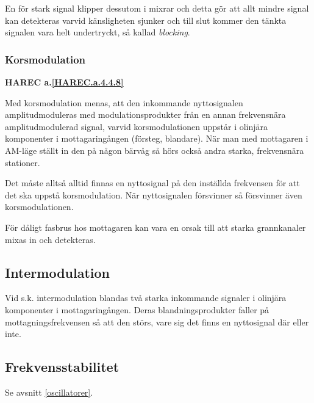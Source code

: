En för stark signal klipper dessutom i mixrar och detta gör att allt mindre
signal kan detekteras varvid känsligheten sjunker och till slut kommer den
tänkta signalen vara helt undertryckt, så kallad \emph{blocking}.

\subsubsection{Korsmodulation}
\textbf{HAREC
  a.\ref{HAREC.a.4.4.8}\label{myHAREC.a.4.4.8}
}

Med korsmodulation menas, att den inkommande nyttosignalen amplitudmoduleras
med modulationsprodukter från en annan frekvensnära amplitudmodulerad signal,
varvid korsmodulationen uppstår i olinjära komponenter i mottagaringången
(försteg, blandare).
När man med mottagaren i AM-läge ställt in den på någon bärvåg så hörs också
andra starka, frekvensnära stationer.

Det måste alltså alltid finnas en nyttosignal på den inställda frekvensen för
att det ska uppstå korsmodulation.
När nyttosignalen försvinner så försvinner även korsmodulationen.

För dåligt fasbrus hos mottagaren kan vara en orsak till att starka
grannkanaler mixas in och detekteras.

\subsection{Intermodulation}

Vid s.k. intermodulation blandas två starka inkommande signaler i olinjära
komponenter i mottagaringången.
Deras blandningsprodukter faller på mottagningsfrekvensen så att den störs,
vare sig det finns en nyttosignal där eller inte.

\subsection{Frekvensstabilitet}

Se avsnitt \ref{oscillatorer}.

